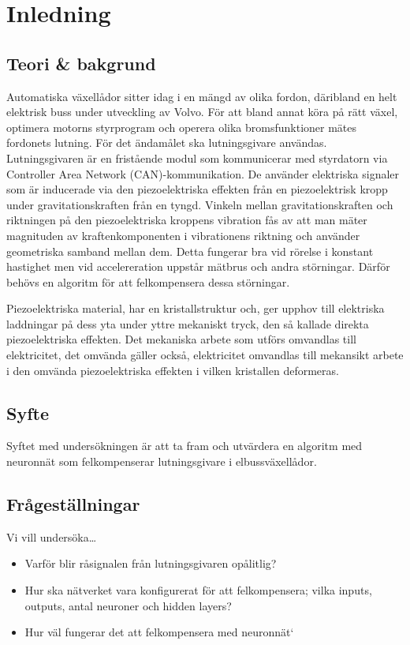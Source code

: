 \section{Inledning}
\subsection{Teori \& bakgrund}

Automatiska växellådor sitter idag i en mängd av olika fordon,
däribland en helt elektrisk buss under utveckling av Volvo.
För att bland annat köra på rätt växel, optimera motorns styrprogram
och operera olika bromsfunktioner %
mätes fordonets lutning.
För det ändamålet ska lutningsgivare användas.
Lutningsgivaren är en fristående modul som kommunicerar med styrdatorn via
Controller Area Network (CAN)-kommunikation.
De använder elektriska signaler som är
inducerade via den piezoelektriska effekten från en piezoelektrisk kropp
under gravitationskraften från en tyngd.
Vinkeln mellan gravitationskraften och
riktningen på den piezoelektriska kroppens vibration
fås av att man mäter magnituden av kraftenkomponenten i vibrationens riktning
och använder geometriska samband mellan dem.
\autocite{chiang00}
Detta fungerar bra vid rörelse i konstant hastighet
men vid accelereration uppstår mätbrus och andra störningar.
Därför behövs en algoritm för att felkompensera dessa störningar.


Piezoelektriska material, har en kristallstruktur och, ger upphov till
elektriska laddningar på dess yta under yttre mekaniskt tryck, den så kallade
direkta piezoelektriska effekten.
Det mekaniska arbete som utförs omvandlas till elektricitet, det omvända gäller
också, elektricitet omvandlas till mekansikt arbete i den omvända
piezoelektriska effekten i vilken kristallen deformeras.
\autocite{electronicdesign2016}

\subsection{Syfte}
Syftet med undersökningen är att ta fram och utvärdera en algoritm med neuronnät som felkompenserar lutningsgivare i elbussväxellådor.

\subsection{Frågeställningar}
Vi vill undersöka\ldots
\begin{itemize}
	\item Varför blir råsignalen från lutningsgivaren opålitlig?
	\item Hur ska nätverket vara konfigurerat för att felkompensera; vilka inputs,
		outputs, antal neuroner och hidden layers?
	\item Hur väl fungerar det att felkompensera med neuronnät`
\end{itemize}
